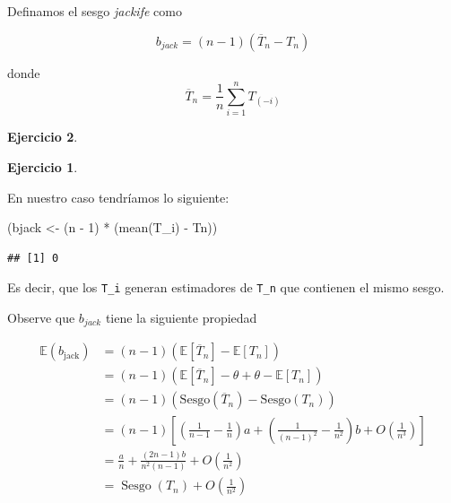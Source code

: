 \documentclass[
  12pt,
]{book}
\newenvironment{Shaded}{\begin{snugshade}}{\end{snugshade}}
\newcommand{\DecValTok}[1]{\textcolor[rgb]{0.00,0.00,0.81}{#1}}
\newcommand{\FunctionTok}[1]{\textcolor[rgb]{0.00,0.00,0.00}{#1}}
\newcommand{\NormalTok}[1]{#1}
\newcommand{\OtherTok}[1]{\textcolor[rgb]{0.56,0.35,0.01}{#1}}
\newcommand{\SpecialCharTok}[1]{\textcolor[rgb]{0.00,0.00,0.00}{#1}}
\theoremstyle{definition}
\theoremstyle{definition}
\theoremstyle{definition}
\newtheorem{exercise}{Ejercicio}[chapter]
\theoremstyle{remark}
\begin{document}
Definamos el sesgo \emph{jackife} como

\begin{equation*}
b_{jack} = (n-1) (\overline{T}_{n} - T_{n})
\end{equation*}

donde
\begin{equation*}
\overline{T}_{n} = \frac{1}{n} \sum_{i=1}^{n} T_{(-i)}
\end{equation*}

\begin{exercise}
\begin{exercise}
\protect\hypertarget{exr:unlabeled-div-33}{}\label{exr:unlabeled-div-33}

\protect\hypertarget{exr:unnamed-chunk-71}{}{\label{exr:unnamed-chunk-71} }En nuestro caso tendríamos lo siguiente:

\end{exercise}
\end{exercise}

\begin{Shaded}
\begin{Highlighting}[]
\NormalTok{(bjack }\OtherTok{\textless{}{-}}\NormalTok{ (n }\SpecialCharTok{{-}} \DecValTok{1}\NormalTok{) }\SpecialCharTok{*}\NormalTok{ (}\FunctionTok{mean}\NormalTok{(T\_i) }\SpecialCharTok{{-}}\NormalTok{ Tn))}
\end{Highlighting}
\end{Shaded}

\begin{verbatim}
## [1] 0
\end{verbatim}

Es decir, que los \texttt{T\_i} generan estimadores de \texttt{T\_n}
que contienen el mismo sesgo.

Observe que \(b_{jack}\) tiene la siguiente propiedad

\begin{align*}
\mathbb{E}\left(b_{\text {jack}}\right)
&= (n-1)\left(\mathbb{E}\left[\overline{T}_{n}\right] -
\mathbb{E}\left[T_{n}\right]\right) \\
&= (n-1)\left(\mathbb{E}\left[\overline{T}_{n}\right] - \theta +
\theta - \mathbb{E}\left[T_{n}\right]\right) \\
& =(n-1)\left(\mathrm{Sesgo} \left(\overline{T}_{n}\right)
-\mathrm{Sesgo}\left(T_{n}\right)\right) \\
& =(n-1)\left[\left(\frac{1}{n-1}
-\frac{1}{n}\right)
a+\left(\frac{1}{(n-1)^{2}}
-\frac{1}{n^{2}}\right) b+O\left(\frac{1}{n^{3}}\right)\right] \\
& =\frac{a}{n}
+\frac{(2 n-1) b}{n^{2}(n-1)}
+O\left(\frac{1}{n^{2}}\right) \\
& =\operatorname{Sesgo}\left(T_{n}\right)
+O\left(\frac{1}{n^{2}}\right)\\
\end{align*}
\end{document}
